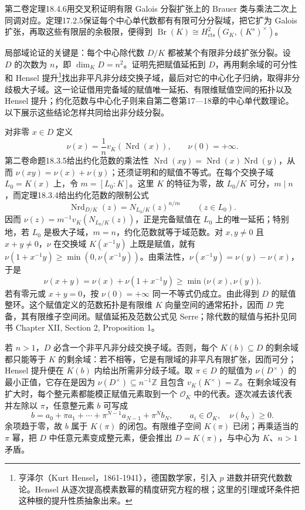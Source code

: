 \begin{proofsketch}
	第二卷定理18.4.6用交叉积证明有限 Galois 分裂扩张上的 Brauer 类与乘法二次上同调对应。定理17.2.5保证每个中心单代数都有有限可分分裂域，把它扩为 Galois 扩张，再取这些有限层的余极限，便得到 \(\operatorname{Br}(K)\cong H^2_{\mathrm{cts}}(G_K,(K^s)^\times)\)。

	局部域论证的关键是：每个中心除代数 \(D/K\) 都被某个有限非分歧扩张分裂。设 \(D\) 的次数为 \(n\)，即 \(\dim_KD=n^2\)。证明先把赋值延拓到 \(D\)，再用剩余域的可分性和 Hensel 提升\footnote{亨泽尔（Kurt Hensel，1861-1941），德国数学家，引入 \(p\) 进数并研究代数数论。Hensel 从逐次提高模素数幂的精度研究方程的根；这里的引理或环条件把这种根的提升性质抽象出来。}找出非平凡非分歧交换子域，最后对它的中心化子归纳，取得非分歧极大子域。这一论证借用完备域的赋值唯一延拓、有限维赋值空间的拓扑以及 Hensel 提升；约化范数与中心化子则来自第二卷第17—18章的中心单代数理论。以下展示这些结论怎样共同给出非分歧分裂。

	对非零 \(x\in D\) 定义
	\[
		\nu(x)=\frac1n v_K(\operatorname{Nrd}(x)),\qquad \nu(0)=+\infty.
	\]
	第二卷命题18.3.5给出约化范数的乘法性 \(\operatorname{Nrd}(xy)=\operatorname{Nrd}(x)\operatorname{Nrd}(y)\)，从而 \(\nu(xy)=\nu(x)+\nu(y)\)；还须证明和的赋值不等式。在每个交换子域 \(L_0=K(x)\) 上，令 \(m=[L_0:K]\)。这里 \(K\) 的特征为零，故 \(L_0/K\) 可分，\(m\mid n\)，而定理18.3.4给出约化范数的限制公式
	\[
		\operatorname{Nrd}_{D/K}(z)=N_{L_0/K}(z)^{n/m}\qquad(z\in L_0).
	\]
	因而 \(\nu(z)=m^{-1}v_K(N_{L_0/K}(z))\)，正是完备赋值在 \(L_0\) 上的唯一延拓；特别地，若 \(L_0\) 是极大子域，\(m=n\)，约化范数就等于域范数。对 \(x,y\ne0\) 且 \(x+y\ne0\)，\(\nu\) 在交换域 \(K(x^{-1}y)\) 上既是赋值，就有 \(\nu(1+x^{-1}y)\ge\min(0,\nu(x^{-1}y))\)。由乘法性，\(\nu(x^{-1}y)=\nu(y)-\nu(x)\)，于是
	\[
		\nu(x+y)=\nu(x)+\nu(1+x^{-1}y) \ge\min\bigl(\nu(x),\nu(y)\bigr).
	\]
	若有零元或 \(x+y=0\)，按 \(\nu(0)=+\infty\) 同一不等式仍成立。由此得到 \(D\) 的赋值整环。这个赋值定义的范数拓扑是有限维 \(K\) 向量空间的通常拓扑，因而 \(D\) 完备，其有限维子空间闭。赋值延拓及范数公式见 Serre\cite[Chapter II, Section 2, Proposition 3 and Corollaries 2--4, pp. 28--30]{Serre1979LocalFields}；除代数的赋值与拓扑见同书 Chapter XII, Section 2, Proposition 1。

	若 \(n>1\)，\(D\) 必含一个非平凡非分歧交换子域。否则，每个 \(K(b)\subseteq D\) 的剩余域都只能等于 \(K\) 的剩余域：若不相等，它是有限域的非平凡有限扩张，因而可分；Hensel 提升便在 \(K(b)\) 内给出所需非分歧子域。取 \(\pi\in D\) 的赋值为 \(\nu(D^\times)\) 的最小正值，它存在是因为 \(\nu(D^\times)\subseteq n^{-1}\mathbb Z\) 且包含 \(v_K(K^\times)=\mathbb Z\)。在剩余域没有扩大时，每个整元素都能模正赋值元素取到一个 \(\mathcal O_K\) 中的代表。逐次减去该代表并左除以 \(\pi\)，任意整元素 \(b\) 可写成
	\[
		b=a_0+\pi a_1+\cdots+\pi^{N-1}a_{N-1}+\pi^Nb_N, \qquad a_i\in\mathcal O_K,\quad \nu(b_N)\ge0.
	\]
	余项趋于零，故 \(b\) 属于 \(K(\pi)\) 的闭包。有限维子空间 \(K(\pi)\) 已闭；再乘适当的 \(\pi\) 幂，把 \(D\) 中任意元素变成整元素，便会推出 \(D=K(\pi)\)，与中心为 \(K\)、\(n>1\) 矛盾。


\end{proofsketch}
